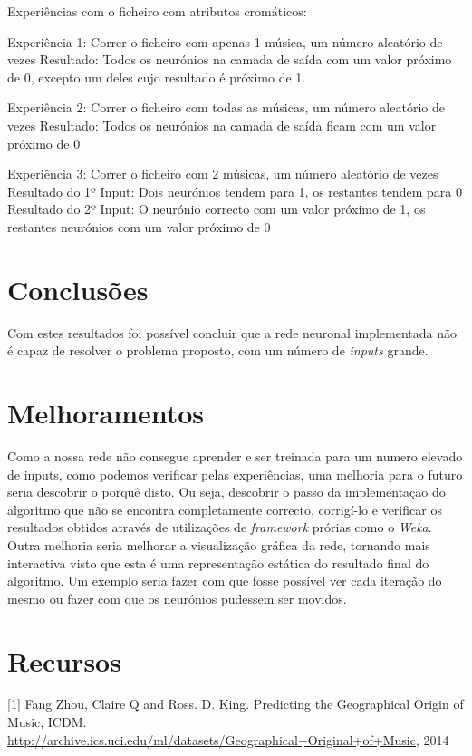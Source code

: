 \documentclass[a4paper]{article}
\begin{document}
Experiências com o ficheiro com atributos cromáticos:

Experiência 1: Correr o ficheiro com apenas 1 música, um número aleatório de vezes
Resultado: Todos os neurónios na camada de saída com um valor próximo de 0, excepto um deles cujo resultado é próximo de 1.

Experiência 2: Correr o ficheiro com todas as músicas, um número aleatório de vezes
Resultado: Todos os neurónios na camada de saída ficam com um valor próximo de 0

Experiência 3: Correr o ficheiro com 2 músicas, um número aleatório de vezes
Resultado do 1º Input: Dois neurónios tendem para 1, os restantes tendem para 0 
Resultado do 2º Input: O neurónio correcto com um valor próximo de 1, os restantes neurónios com um valor próximo de 0


\section{Conclusões}
Com estes resultados foi possível concluir que a rede neuronal implementada não é capaz de resolver o problema proposto, com um número de \textit{inputs} grande. 


\section{Melhoramentos}

Como a nossa rede não consegue aprender e ser treinada para um numero elevado de inputs, como podemos verificar pelas experiências, uma melhoria para o futuro seria descobrir o porquê disto. Ou seja, descobrir o passo da implementação do algoritmo que não se encontra completamente correcto, corrigí-lo e verificar os resultados obtidos através de utilizações de \textit{framework} prórias como o \textit{Weka}.
Outra melhoria seria melhorar a visualização gráfica da rede, tornando mais interactiva visto que esta é uma representação estática do resultado final do algoritmo. Um exemplo seria fazer com que fosse possível ver cada iteração do mesmo ou fazer com que os neurónios pudessem ser movidos.


\section{Recursos}

[1] Fang Zhou, Claire Q and Ross. D. King. Predicting the Geographical Origin of Music, ICDM.
\url{http://archive.ics.uci.edu/ml/datasets/Geographical+Original+of+Music}, 2014
\end{document}
